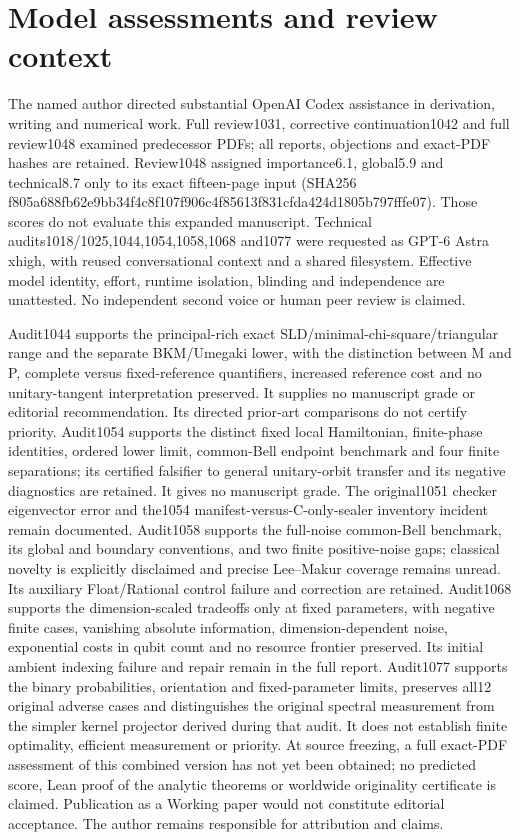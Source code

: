 \section{Model assessments and review context}\label{sec:assessment}
The named author directed substantial OpenAI Codex assistance in derivation, writing and numerical work. Full review1031, corrective continuation1042 and full review1048 examined predecessor PDFs; all reports, objections and exact-PDF hashes are retained. Review1048 assigned importance6.1, global5.9 and technical8.7 only to its exact fifteen-page input (SHA256 f805a688fb62e9bb34f4c8f107f906c4f85613f831cfda424d1805b797fffe07). Those scores do not evaluate this expanded manuscript. Technical audits1018/1025,1044,1054,1058,1068 and1077 were requested as GPT-6 Astra xhigh, with reused conversational context and a shared filesystem. Effective model identity, effort, runtime isolation, blinding and independence are unattested. No independent second voice or human peer review is claimed.

Audit1044 supports the principal-rich exact SLD/minimal-chi-square/triangular range and the separate BKM/Umegaki lower, with the distinction between M and P, complete versus fixed-reference quantifiers, increased reference cost and no unitary-tangent interpretation preserved. It supplies no manuscript grade or editorial recommendation. Its directed prior-art comparisons do not certify priority. Audit1054 supports the distinct fixed local Hamiltonian, finite-phase identities, ordered lower limit, common-Bell endpoint benchmark and four finite separations; its certified falsifier to general unitary-orbit transfer and its negative diagnostics are retained. It gives no manuscript grade. The original1051 checker eigenvector error and the1054 manifest-versus-C-only-sealer inventory incident remain documented. Audit1058 supports the full-noise common-Bell benchmark, its global and boundary conventions, and two finite positive-noise gaps; classical novelty is explicitly disclaimed and precise Lee--Makur coverage remains unread. Its auxiliary Float/Rational control failure and correction are retained. Audit1068 supports the dimension-scaled tradeoffs only at fixed parameters, with negative finite cases, vanishing absolute information, dimension-dependent noise, exponential costs in qubit count and no resource frontier preserved. Its initial ambient indexing failure and repair remain in the full report. Audit1077 supports the binary probabilities, orientation and fixed-parameter limits, preserves all12 original adverse cases and distinguishes the original spectral measurement from the simpler kernel projector derived during that audit. It does not establish finite optimality, efficient measurement or priority. At source freezing, a full exact-PDF assessment of this combined version has not yet been obtained; no predicted score, Lean proof of the analytic theorems or worldwide originality certificate is claimed. Publication as a Working paper would not constitute editorial acceptance. The author remains responsible for attribution and claims.

